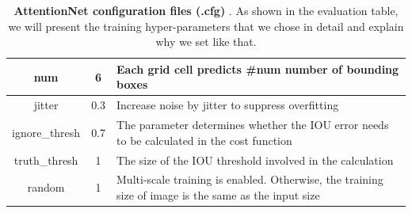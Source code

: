 \begin{table}[t]
{\begin{tabular}{@{}ccl@{}}
\multicolumn{1}{|c|}{num}            & \multicolumn{1}{c|}{6}                                                                               & \multicolumn{1}{l|}{Each grid cell predicts \#num number of bounding boxes}                                                                                                                                                                                                                                                                                                                            \\ \midrule
\multicolumn{1}{|c|}{jitter}         & \multicolumn{1}{c|}{0.3}                                                                             & \multicolumn{1}{l|}{Increase noise by jitter to suppress overfitting}                                                                                                                                                                                                                                                                                                                                  \\ \midrule
\multicolumn{1}{|c|}{ignore\_thresh} & \multicolumn{1}{c|}{0.7}                                                                             & \multicolumn{1}{l|}{The parameter determines whether the IOU error needs to be calculated  in the cost function}                                                                                                                                                                                                                                                                                       \\ \midrule
\multicolumn{1}{|c|}{truth\_thresh}  & \multicolumn{1}{c|}{1}                                                                               & \multicolumn{1}{l|}{The size of the IOU threshold involved in the calculation}                                                                                                                                                                                                                                                                                                                         \\ \midrule
\multicolumn{1}{|c|}{random}         & \multicolumn{1}{c|}{1}                                                                               & \multicolumn{1}{l|}{Multi-scale training is enabled. Otherwise, the training size of image is the same as the input size}                                                                                                                                                                                                                                                                              \\ \bottomrule
\end{tabular}}
\caption{ \textbf{AttentionNet configuration files (.cfg) }. As shown in the evaluation table, we will present the training hyper-parameters that we chose in detail and explain why we set like that.}
\end{table}


